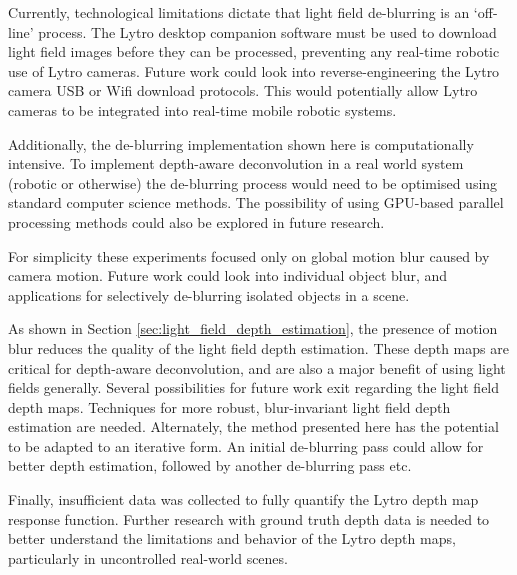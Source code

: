 Currently, technological limitations dictate that light field de-blurring is an \enquote*{off-line} process.
The Lytro desktop companion software must be used to download light field images before they can be processed, preventing any real-time robotic use of Lytro cameras.
Future work could look into reverse-engineering the Lytro camera USB or Wifi download protocols.
This would potentially allow Lytro cameras to be integrated into real-time mobile robotic systems.

Additionally, the de-blurring implementation shown here is computationally intensive.
To implement depth-aware deconvolution in a real world system (robotic or otherwise) the de-blurring process would need to be optimised using standard computer science methods.
The possibility of using GPU-based parallel processing methods could also be explored in future research.

For simplicity these experiments focused only on global motion blur caused by camera motion.
Future work could look into individual object blur, and applications for selectively de-blurring isolated objects in a scene.

As shown in Section \ref{sec:light_field_depth_estimation}, the presence of motion blur reduces the quality of the light field depth estimation.
These depth maps are critical for depth-aware deconvolution, and are also a major benefit of using light fields generally.
Several possibilities for future work exit regarding the light field depth maps.
Techniques for more robust, blur-invariant light field depth estimation are needed.
Alternately, the method presented here has the potential to be adapted to an iterative form.
An initial de-blurring pass could allow for better depth estimation, followed by another de-blurring pass etc.

Finally, insufficient data was collected to fully quantify the Lytro depth map response function.
Further research with ground truth depth data is needed to better understand the limitations and behavior of the Lytro depth maps, particularly in uncontrolled real-world scenes.


